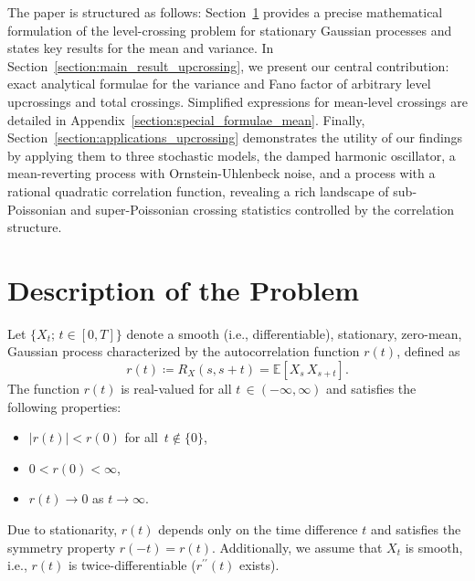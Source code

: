 \documentclass[journal]{IEEEtran}
\theoremstyle{plain}
\theoremstyle{definition}
\theoremstyle{remark}
\newcommand{\E}{\mathbb{E}}
\begin{document}
The paper is structured as follows: Section~\ref{section:description_of_problem} provides a precise mathematical formulation of the level-crossing problem for stationary Gaussian processes and states key results for the mean and variance. In Section~\ref{section:main_result_upcrossing}, we present our central contribution: exact analytical formulae for the variance and Fano factor of arbitrary level upcrossings and total crossings. Simplified expressions for mean-level crossings are detailed in Appendix~\ref{section:special_formulae_mean}. Finally, Section~\ref{section:applications_upcrossing} demonstrates the utility of our findings by applying them to three stochastic models, the damped harmonic oscillator, a mean-reverting process with Ornstein-Uhlenbeck noise, and a process with a rational quadratic correlation function, revealing a rich landscape of sub-Poissonian and super-Poissonian crossing statistics controlled by the correlation structure.



\section{Description of the Problem} \label{section:description_of_problem}

Let $\{X_t; \, t\in [0,T]\}$ denote a smooth (i.e., differentiable), stationary, zero-mean, Gaussian process characterized by the autocorrelation function $r(t)$, defined as
\begin{equation}
    r(t) \coloneqq R_X(s, s+t) = \E\left[X_s \, X_{s+t} \right].
\end{equation}
The function $r(t)$ is real-valued for all $t \, \in (-\infty,\infty)$ and satisfies the following properties:
\begin{itemize}
    \item $|r(t)| < r(0)$ for all $\, t \notin\{0\}$,
    \item $0 < r(0) < \infty$,
    \item $r(t) \rightarrow 0$ as $t \rightarrow \infty$.    
\end{itemize}
Due to stationarity, $r(t)$ depends only on the time difference $t$ and satisfies the symmetry property $r(-t) = r(t)$. Additionally, we assume that $X_t$ is smooth, i.e., $r(t)$ is twice-differentiable ($r^{\prime\prime}(t)$ exists). 
\end{document}
